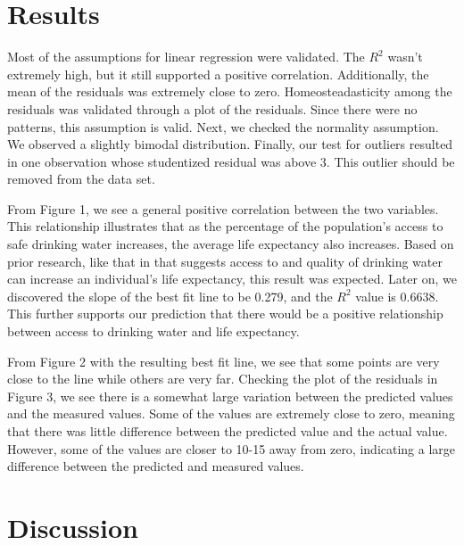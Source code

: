 \documentclass[12pt]{article}
\begin{document}
\section{Results}

Most of the assumptions for linear regression were validated. The $R^2$ wasn't extremely high, but it still supported a positive correlation. Additionally, the mean of the residuals was extremely close to zero. Homeosteadasticity among the residuals was validated through a plot of the residuals. Since there were no patterns, this assumption is valid. Next, we checked the normality assumption. We observed a slightly bimodal distribution. Finally, our test for outliers resulted in one observation whose studentized residual was above 3. This outlier should be removed from the data set.

From Figure 1, we see a general positive correlation between the two variables. This relationship illustrates that as the percentage of the population's access to safe drinking water increases, the average life expectancy also increases. Based on prior research, like that in \citet{angelakis2021quality} that suggests access to and quality of drinking water can increase an individual's life expectancy, this result was expected. Later on, we discovered the slope of the best fit line to be 0.279, and the $R^2$ value is 0.6638. This further supports our prediction that there would be a positive relationship between access to drinking water and life expectancy.

From Figure 2 with the resulting best fit line, we see that some points are very close to the line while others are very far. Checking the plot of the residuals in Figure 3, we see there is a somewhat large variation between the predicted values and the measured values. Some of the values are extremely close to zero, meaning that there was little difference between the predicted value and the actual value. However, some of the values are closer to 10-15 away from zero, indicating a large difference between the predicted and measured values.

\section{Discussion}
\end{document}
